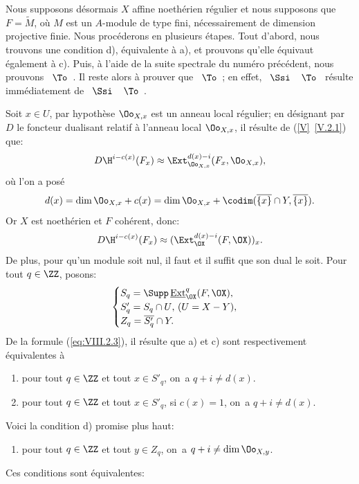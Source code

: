 Nous supposons d\'esormais $X$ affine noeth\'erien r\'egulier et nous supposons que \hbox{$F=\widetilde{M}$}, o\`u $M$ est un $A$-module de type fini, n\'ecessairement de dimension projective finie. Nous proc\'ederons en plusieurs \'etapes. Tout d'abord, nous trouvons une condition d), \'equivalente \`a a), et prouvons qu'elle \'equivaut \'egalement \`a c). Puis, \`a l'aide de la suite spectrale du num\'ero pr\'ec\'edent, nous prouvons ~$\To$~. Il reste alors \`a prouver que ~$\To$~; en effet, ~$\Ssi$~~$\To$~ r\'esulte imm\'ediatement de ~$\Ssi$~~$\To$~.

Soit $x\in U$, par hypoth\`ese $\Oo_{X, x}$ est un anneau local r\'egulier; en d\'esignant par $D$ le foncteur dualisant relatif \`a l'anneau local $\Oo_{X, x}$, il r\'esulte de (\ref{V}~\ref{V.2.1}) que:
\[D\H^{i-c(x)}(F_x)\approx \Ext^{d(x)-i}_{\Oo_{X, x}}(F_x, \Oo_{X, x}), \]
o\`u l'on a pos\'e
\begin{equation} \label{eq:VIII.2.2} d(x)=\dim \Oo_{X, x} + c(x) = \dim \Oo_{X, x}+\codim(\overline{\{x\}}\cap Y, \overline{\{x\}}).
\end{equation}
Or $X$ est noeth\'erien et $F$ coh\'erent, donc:
\begin{equation} \label{eq:VIII.2.3} D\H^{i-c(x)}(F_x)\approx (\Ext^{d(x)-i}_{\OX}(F, \OX))_x.
\end{equation}
De plus, pour qu'un module soit nul, il faut et il suffit que son dual le soit. Pour tout $q\in\ZZ$, posons:
\begin{equation} \label{eq:VIII.2.4}
\begin{cases}
S_q=\Supp \mathop{\underline{\mathrm{Ext}}}\nolimits^q_{\OX}(F, \OX), \\
S'_q=S_q\cap U\text{, (}U=X-Y\text{)}, \\
Z_q=\overline{S'_q}\cap Y.
\end{cases}
\end{equation}
De la formule (\ref{eq:VIII.2.3}), il r\'esulte que a) et c) sont respectivement \'equivalentes \`a
\begin{enumerate}
\item[a$'$)]
pour tout $q\in\ZZ$ et tout $x\in S'_q$, on~a $q+i\neq d(x)$.

\item[c$'$)]
pour tout $q\in\ZZ$ et tout $x\in S'_q$, si $c(x)=1$, on~a $q+i\neq d(x)$.
\end{enumerate}
\noindent Voici la condition d) promise plus haut:
\begin{enumerate}
\item[d)]
pour tout $q\in \ZZ$ et tout $y\in Z_q$, on~a $q+i\neq \dim \Oo_{X, y}$.
\end{enumerate}
\noindent Ces conditions sont \'equivalentes:

